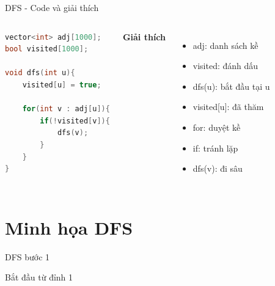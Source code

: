 \documentclass{beamer}
\newcommand{\hlblue}[1]{\textcolor{myblue}{#1}}
\newcommand{\hlgreen}[1]{\textcolor{mygreen}{#1}}
\newcommand{\hlred}[1]{\textcolor{myred}{#1}}
\newcommand{\hlpurple}[1]{\textcolor{mypurple}{#1}}
\newcommand{\hlorange}[1]{\textcolor{myorange}{#1}}
\begin{document}
\begin{frame}[fragile]{DFS - Code và giải thích}

\begin{columns}

\begin{tcolorbox}
\begin{lstlisting}[language=C++]
vector<int> adj[1000];
bool visited[1000];

void dfs(int u){
    visited[u] = true;

    for(int v : adj[u]){
        if(!visited[v]){
            dfs(v);
        }
    }
}
\end{lstlisting}
\end{tcolorbox}


\textbf{Giải thích}

\begin{itemize}
\item \hlblue{adj}: danh sách kề
\item \hlgreen{visited}: đánh dấu
\item \hlorange{dfs(u)}: bắt đầu tại u
\item \hlred{visited[u]}: đã thăm
\item \hlblue{for}: duyệt kề
\item \hlred{if}: tránh lặp
\item \hlpurple{dfs(v)}: đi sâu
\end{itemize}

\end{columns}

\end{frame}

\section{Minh họa DFS}

\begin{frame}{DFS bước 1}
\begin{center}
\end{center}

Bắt đầu từ đỉnh 1
\end{frame}
\end{document}

